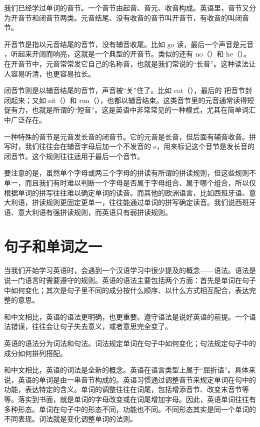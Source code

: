 \documentclass[10.5pt, a4paper]{ctexbook} %
\begin{document}
我们已经学过单词的音节。一个音节由起音、音元、收音构成。英语里，音节又分为开音节和闭音节两类。元音结尾、没有收音的音节叫开音节，有收音的叫闭音节。

开音节是指以元音结尾的音节，没有辅音收尾。比如 go 读，最后一个声音是元音 ，听起来开阔而响亮，这就是一个典型的开音节。类似的还有 no（）和 he（）。在开音节中，元音常常发它自己的名称音，也就是我们常说的“长音”。这种读法让人容易听清，也更容易拉长。

闭音节则是以辅音结尾的音节，声音被“关”住了。比如 cat（），最后的 把音节封闭起来；又如 sit（）和 run（），也都以辅音结束。这类音节里的元音通常读得短促有力，也就是所谓的“短音”。这是英语中非常常见的一种模式，尤其在简单词汇中广泛存在。

一种特殊的音节是元音发长音的闭音节。它的元音是长音，但后面有辅音收音。拼写时，我们往往会在辅音字母后加一个不发音的 e，用来标记这个音节是发长音的闭音节。这个规则往往适用于最后一个音节。

要注意的是，虽然单个字母或两三个字母的拼读有所谓的拼读规则，但这些规则不单一，而且我们有时难以判断一个字母是否属于字母组合、属于哪个组合，所以仅根据单词的拼写往往难以确定单词的读音。而其他的欧洲语言，比如西班牙语、意大利语，拼读规则更固定更单一，往往能通过单词的拼写确定读音。我们说西班牙语、意大利语有强拼读规则，而英语只有弱拼读规则。

\chapter{句子和单词之一}

当我们开始学习英语时，会遇到一个汉语学习中很少提及的概念——语法。语法是说一门语言时需要遵守的规则。英语的语法主要包括两个方面：首先是单词在句子中如何变化；其次是句子里不同的成分按什么顺序、以什么方式相互配合，表达完整的意思。

和中文相比，英语的语法更明确，也更重要。遵守语法是说好英语的前提。一个语法错误，往往会让句子失去意义，或者意思完全变了。

英语的语法分为词法和句法。词法规定单词在句子中如何变化；句法规定句子中的成分如何排列搭配。

和中文相比，英语的词法是全新的概念。英语在语言类型上属于“屈折语”。具体来说，英语的单词是由一串音节构成的。英语习惯通过调整音节来规定单词在句中的功能，表达特定的含义。单词的调整往往在词尾，包括增添音节、改变末音节等等。落实到书面，就是单词的字母改变或在词尾增加字母。因此，英语单词往往有多种形态。单词在句子中的形态不同，功能也不同。不同形态其实是同一个单词的不同表现。词法就是变化调整单词的法则。
\end{document}
